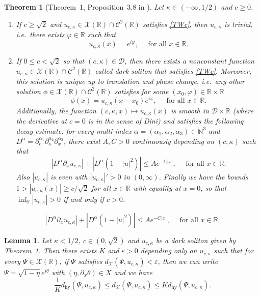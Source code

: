 \documentclass[10pt,a4paper]{amsart}
\newtheorem{theorem}{Theorem}
\newtheorem{lemma}{Lemma}
\newcommand{\N}{\mathbb{N}}
\newcommand{\R}{\mathbb{R}}
\newcommand{\boC}{\mathcal{C}}
\begin{document}
	\begin{theorem}[Theorem~1, Proposition~3.8 in \cite{delaire2023exotic}]
		\label{thm:classiftw}
		Let $\kappa\in(-\infty,1/2)$ and $c\geq0$.
		\begin{enumerate}
			\item If $c\geq\sqrt{2}$ and $u_{c,\kappa}\in\mathcal{X}(\R)\cap\boC^{2}(\R)$  satisfies \eqref{TWc}, then $u_{c,\kappa}$ is trivial, i.e.\ there exists $\varphi\in\R$ such that 
			$$u_{c,\kappa}(x)=e^{i\varphi},\quad\text{ for all } x\in\R.$$  
			\item If $0\leq c<\sqrt{2}$ so that $(c,\kappa)\in\mathcal{D}$, then there exists a nonconstant function $u_{c,\kappa}\in\mathcal{X}(\R)\cap\boC^{2}(\R)$ called dark soliton that satisfies \eqref{TWc}.
			Moreover, this solution is unique up to translation and phase change, i.e.\
			any other solution $\phi\in\mathcal{X}(\R)\cap\boC^{2}(\R)$ satisfies for some $(x_0,\varphi)\in\R\times\R$ $$\phi(x)=u_{c,\kappa}(x-x_0)e^{i\varphi},\quad\text{ for all }x\in\R.$$ 
			Additionally, the function $(c,\kappa,x)\mapsto u_{c,\kappa}(x)$ is smooth in $\mathcal{D}\times\R$ (where the derivative at $c=0$ is in the sense of Dini) and satisfies the following decay estimate: for every multi-index $\alpha=(\alpha_1,\alpha_2,\alpha_3)\in\N^3$ and $D^\alpha=\partial_c^{\alpha_1}\partial_\kappa^{\alpha_2}\partial_{x}^{\alpha_3}$, there exist $A,C>0$ continuously depending on $(c,\kappa)$ such that
			\begin{equation}\label{eq:decaydark}
				|D^\alpha\partial_xu_{c,\kappa}|+|D^\alpha(1-|u|^2)|\leq Ae^{-C|x|},\quad\text{ for all }x\in\R.
			\end{equation}
			Also $|u_{c,\kappa}|$ is even with $|u_{c,\kappa}|'>0$ in $(0,\infty)$. Finally we have the bounds $1>|u_{c,\kappa}(x)|\geq c/\sqrt{2}$ for all $x\in\R$ with equality at $x=0$, so that $\inf_\R|u_{c,\kappa}|>0$ if and only if $c>0$.
		\end{enumerate} 
	\end{theorem}

			\begin{equation}
				|D^\alpha\partial_xu_{c,\kappa}|+|D^\alpha(1-|u|^2)|\leq Ae^{-C|x|},\quad\text{ for all }x\in\R.
			\end{equation}

	\begin{lemma}\label{lem:dequiv}
		Let $\kappa<1/2$, $c\in(0,\sqrt{2})$ and $u_{c,\kappa}$ be a dark soliton given by Theorem~\ref{thm:classiftw}. Then there exists $K$ and $\varepsilon>0$ depending only on $u_{c,\kappa}$ such that for every $\Psi\in\mathcal{X}(\R)$, if $\Psi$ satisfies $d_\mathcal{X}(\Psi,u_{c,\kappa})<\varepsilon$, then we can write $\Psi=\sqrt{1-\eta}e^{i\theta}$ with $(\eta,\partial_x\theta)\in X$ and we have
		\begin{equation}
			\frac{1}{K}d_{\mathrm{hy}}(\Psi,u_{c,\kappa})\leq d_{\mathcal{X}}(\Psi,u_{c,\kappa})\leq Kd_{\mathrm{hy}}(\Psi,u_{c,\kappa}).
		\end{equation} 
	\end{lemma}
\end{document}
